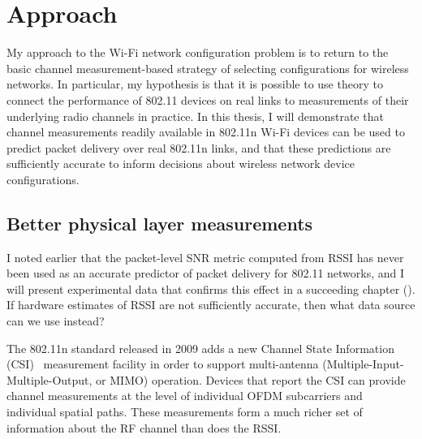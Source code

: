 
\section{Approach}
\label{sec:intro_approach}
My approach to the Wi-Fi network configuration problem is to return to the basic channel measurement-based strategy of selecting configurations for wireless networks. In particular, my hypothesis is that it is possible to use theory to connect the performance of 802.11 devices on real links to measurements of their underlying radio channels in practice. In this thesis, I will demonstrate that channel measurements readily available in 802.11n Wi-Fi devices can be used to predict packet delivery over real 802.11n links, and that these predictions are sufficiently accurate to inform decisions about wireless network device configurations.

\subsection{Better physical layer measurements}
I noted earlier that the packet-level SNR metric computed from RSSI has never been used as an accurate predictor of packet delivery for 802.11 networks, and I will present experimental data that confirms this effect in a succeeding chapter (). If hardware estimates of RSSI are not sufficiently accurate, then what data source can we use instead?

The 802.11n standard released in 2009 adds a new Channel State Information (CSI)~\cite[\S7.3.1.27]{80211n} measurement facility in order to support multi-antenna (Multiple-Input-Multiple-Output, or MIMO) operation. Devices that report the CSI can provide channel measurements at the level of individual OFDM subcarriers and individual spatial paths. These measurements form a much richer set of information about the RF channel than does the RSSI.

